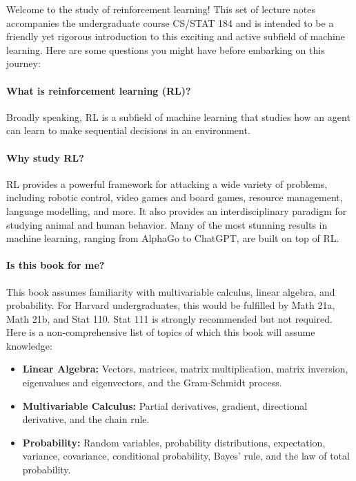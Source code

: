 \documentclass[../main/main]{subfiles}
\begin{document}
Welcome to the study of reinforcement learning! This set of lecture notes accompanies the undergraduate course CS/STAT 184 and is intended to be a friendly yet rigorous introduction to this exciting and active subfield of machine learning. Here are some questions you might have before embarking on this journey:

\paragraph{What is reinforcement learning (RL)?} Broadly speaking, RL is a subfield of machine learning that studies how an agent can learn to make sequential decisions in an environment.

\paragraph{Why study RL?} RL provides a powerful framework for attacking a wide variety of problems, including robotic control, video games and board games, resource management, language modelling, and more. It also provides an interdisciplinary paradigm for studying animal and human behavior. Many of the most stunning results in machine learning, ranging from AlphaGo to ChatGPT, are built on top of RL.

\paragraph{Is this book for me?} This book assumes familiarity with multivariable calculus, linear algebra, and probability. For Harvard undergraduates, this would be fulfilled by Math 21a, Math 21b, and Stat 110. Stat 111 is strongly recommended but not required. Here is a non-comprehensive list of topics of which this book will assume knowledge:

\begin{itemize}
    \item \textbf{Linear Algebra:} Vectors, matrices, matrix multiplication, matrix inversion, eigenvalues and eigenvectors, and the Gram-Schmidt process.
    \item \textbf{Multivariable Calculus:} Partial derivatives, gradient, directional derivative, and the chain rule.
    \item \textbf{Probability:} Random variables, probability distributions, expectation, variance, covariance, conditional probability, Bayes' rule, and the law of total probability.
\end{itemize}
\end{document}
